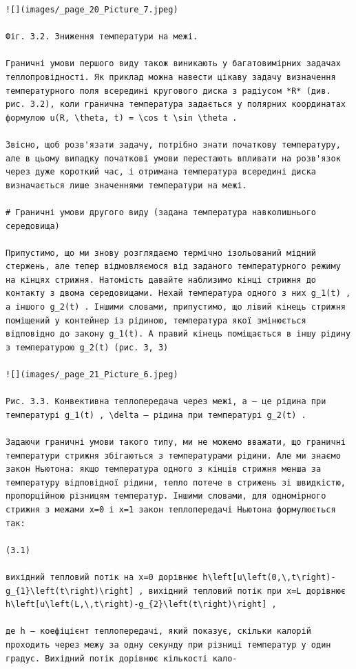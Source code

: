 \documentclass[
  ukrainian,
]{article}
\begin{document}
\begin{verbatim}
![](images/_page_20_Picture_7.jpeg)

Фіг. 3.2. Зниження температури на межі.

Граничні умови першого виду також виникають у багатовимірних задачах теплопровідності. Як приклад можна навести цікаву задачу визначення температурного поля всередині кругового диска з радіусом *R* (див. рис. 3.2), коли гранична температура задається у полярних координатах формулою u(R, \theta, t) = \cos t \sin \theta .

Звісно, щоб розв'язати задачу, потрібно знати початкову температуру, але в цьому випадку початкові умови перестають впливати на розв'язок через дуже короткий час, і отримана температура всередині диска визначається лише значеннями температури на межі.

# Граничні умови другого виду (задана температура навколишнього середовища)

Припустимо, що ми знову розглядаємо термічно ізольований мідний стержень, але тепер відмовляємося від заданого температурного режиму на кінцях стрижня. Натомість давайте наблизимо кінці стрижня до контакту з двома середовищами. Нехай температура одного з них g_1(t) , а іншого g_2(t) . Іншими словами, припустимо, що лівий кінець стрижня поміщений у контейнер із рідиною, температура якої змінюється відповідно до закону g_1(t). А правий кінець поміщається в іншу рідину з температурою g_2(t) (рис. 3, 3)

![](images/_page_21_Picture_6.jpeg)

Рис. 3.3. Конвективна теплопередача через межі, a — це рідина при температурі g_1(t) , \delta — рідина при температурі g_2(t) .

Задаючи граничні умови такого типу, ми не можемо вважати, що граничні температури стрижня збігаються з температурами рідини. Але ми знаємо закон Ньютона: якщо температура одного з кінців стрижня менша за температуру відповідної рідини, тепло потече в стрижень зі швидкістю, пропорційною різницям температур. Іншими словами, для одномірного стрижня з межами x=0 і x=1 закон теплопередачі Ньютона формулюється так:

(3.1)

вихідний тепловий потік на x=0 дорівнює h\left[u\left(0,\,t\right)-g_{1}\left(t\right)\right] , вихідний тепловий потік при x=L дорівнює h\left[u\left(L,\,t\right)-g_{2}\left(t\right)\right] ,

де h — коефіцієнт теплопередачі, який показує, скільки калорій проходить через межу за одну секунду при різниці температур у один градус. Вихідний потік дорівнює кількості кало-


\end{verbatim}
\end{document}
